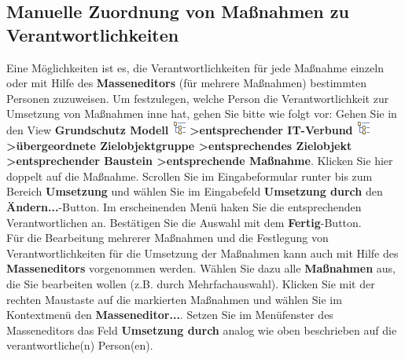 \documentclass[a4paper,10pt]{book}
\begin{document}
\subsection{Manuelle Zuordnung von Maßnahmen zu Verantwortlichkeiten}
Eine Möglichkeiten ist es, die Verantwortlichkeiten für jede Maßnahme einzeln oder mit Hilfe des \textbf{Masseneditors} (für mehrere Maßnahmen) bestimmten Personen zuzuweisen. Um festzulegen, welche Person die Verantwortlichkeit zur Umsetzung von Maßnahmen inne hat, gehen Sie bitte wie folgt vor: Gehen Sie in den View \textbf{Grundschutz Modell \includegraphics[height=2ex]{Icon/GS_Modell.png} \textgreater entsprechender IT-Verbund \includegraphics[height=2ex]{Icon/GS_Modell.png} \textgreater übergeordnete Zielobjektgruppe \textgreater entsprechendes Zielobjekt \textgreater entsprechender Baustein \textgreater entsprechende Maßnahme}. Klicken Sie hier doppelt auf die Maßnahme. Scrollen Sie im Eingabeformular runter bis zum Bereich \textbf{Umsetzung} und wählen Sie im Eingabefeld \textbf{Umsetzung durch} den \textbf{Ändern...}-Button. Im erscheinenden Menü haken Sie die entsprechenden Verantwortlichen an. Bestätigen Sie die Auswahl mit dem \textbf{Fertig}-Button.
\newline\\
Für die Bearbeitung mehrerer Maßnahmen und die Festlegung von Verantwortlichkeiten für die Umsetzung der Maßnahmen kann auch mit Hilfe des \textbf{Masseneditors} vorgenommen werden. Wählen Sie dazu alle \textbf{Maßnahmen} aus, die Sie bearbeiten wollen (z.B. durch Mehrfachauswahl). Klicken Sie mit der rechten Maustaste auf die markierten Maßnahmen und wählen Sie im Kontextmenü den \textbf{Masseneditor...}. Setzen Sie im Menüfenster des Masseneditors das Feld \textbf{Umsetzung durch} analog wie oben beschrieben auf die verantwortliche(n) Person(en).
\end{document}

